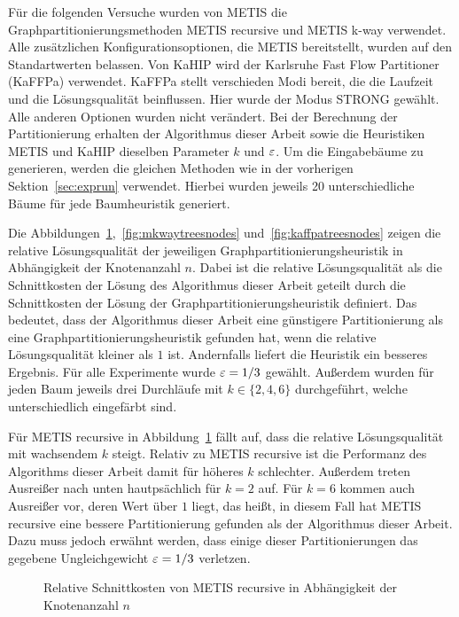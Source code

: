 Für die folgenden Versuche wurden von METIS die Graphpartitionierungsmethoden METIS recursive und METIS k-way verwendet.
Alle zusätzlichen Konfigurationsoptionen, die METIS bereitstellt, wurden auf den Standartwerten belassen.
Von KaHIP wird der Karlsruhe Fast Flow Partitioner (KaFFPa) verwendet.
KaFFPa stellt verschieden Modi bereit, die die Laufzeit und die Lösungsqualität beinflussen.
Hier wurde der Modus STRONG gewählt.
Alle anderen Optionen wurden nicht verändert.
Bei der Berechnung der Partitionierung erhalten der Algorithmus dieser Arbeit sowie die Heuristiken METIS und KaHIP dieselben Parameter $k$ und $\varepsilon$.
Um die Eingabebäume zu generieren, werden die gleichen Methoden wie in der vorherigen Sektion~\ref{sec:exprun} verwendet.
Hierbei wurden jeweils 20 unterschiedliche Bäume für jede Baumheuristik generiert.

Die Abbildungen~\ref{fig:mrectreesnodes},~\ref{fig:mkwaytreesnodes} und~\ref{fig:kaffpatreesnodes} zeigen die relative Lösungsqualität der jeweiligen Graphpartitionierungsheuristik in Abhängigkeit der Knotenanzahl $n$.
Dabei ist die relative Lösungsqualität als die Schnittkosten der Lösung des Algorithmus dieser Arbeit geteilt durch die Schnittkosten der Lösung der Graphpartitionierungsheuristik definiert.
Das bedeutet, dass der Algorithmus dieser Arbeit eine günstigere Partitionierung als eine Graphpartitionierungsheuristik gefunden hat, wenn die relative Lösungsqualität kleiner als $1$ ist.
Andernfalls liefert die Heuristik ein besseres Ergebnis.
Für alle Experimente wurde $\varepsilon=1/3$ gewählt.
Außerdem wurden für jeden Baum jeweils drei Durchläufe mit $k \in \{2, 4, 6\}$ durchgeführt, welche unterschiedlich eingefärbt sind.

Für METIS recursive in Abbildung~\ref{fig:mrectreesnodes} fällt auf, dass die relative Lösungsqualität mit wachsendem $k$ steigt.
Relativ zu METIS recursive ist die Performanz des Algorithms dieser Arbeit damit für höheres $k$ schlechter.
Außerdem treten Ausreißer nach unten hautpsächlich für $k=2$ auf.
Für $k=6$ kommen auch Ausreißer vor, deren Wert über $1$ liegt, das heißt, in diesem Fall hat METIS recursive eine bessere Partitionierung gefunden als der Algorithmus dieser Arbeit.
Dazu muss jedoch erwähnt werden, dass einige dieser Partitionierungen das gegebene Ungleichgewicht $\varepsilon=1/3$ verletzen.

\begin{figure}[H]
    \centering
    
    \caption{Relative Schnittkosten von METIS recursive in Abhängigkeit der Knotenanzahl $n$\label{fig:mrectreesnodes}}
\end{figure}

